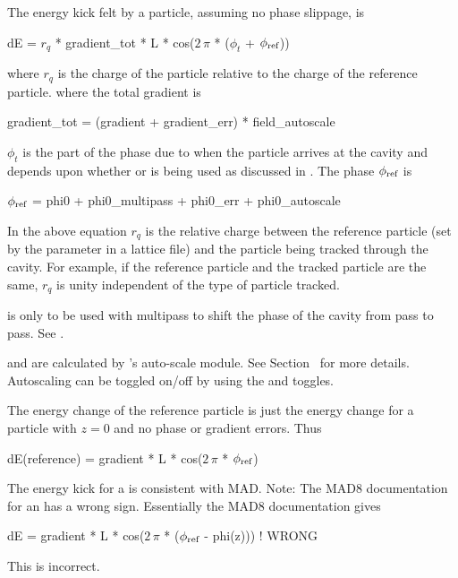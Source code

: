 The energy kick felt by a particle, assuming no phase slippage, is 
\begin{example}
  dE = \(r_q\) * gradient_tot * L * cos(\(2\,\pi\) * (\(\phi_t\) + \(\phi_{\text{ref}}\)))
\end{example}
where $r_q$ is the charge of the particle relative to the charge of the reference particle.
where the total gradient is
\begin{example}
  gradient_tot = (gradient + gradient_err) * field_autoscale
\end{example}
$\phi_t$ is the part of the phase due to when the particle arrives at the cavity and depends upon
whether  or  is being used as discussed in
. The phase $\phi_{\text{ref}}$ is
\begin{example}
  \(\phi_{\text{ref}}\) = phi0 + phi0_multipass + phi0_err + phi0_autoscale
  \label{lcav.phi}
\end{example}

In the above equation $r_q$ is the relative charge between the reference particle (set by the
 parameter in a lattice file) and the particle being tracked through the
cavity. For example, if the reference particle and the tracked particle are the same, $r_q$ is
unity independent of the type of particle tracked.

 is only to be used with multipass to shift the phase of the cavity from pass to
pass. See .

 and  are calculated by \bmad's auto-scale module. See
Section~ for more details. Autoscaling can be toggled on/off by using the
 and  toggles.

The energy change of the reference particle is just the energy change for a 
particle with $z = 0$ and no phase or gradient errors. Thus
\begin{example}
  dE(reference) = gradient * L * cos(\(2\,\pi\) * \(\phi_{\text{ref}}\))
\end{example}

The energy kick for a \bmad {} is consistent with MAD. 
Note: The MAD8 documentation for an  has a wrong
sign. Essentially the MAD8 documentation gives
\begin{example}
  dE = gradient * L * cos(\(2\,\pi\) * (\(\phi_{\text{ref}}\) - phi(z))) ! WRONG
\end{example}
This is incorrect. 

